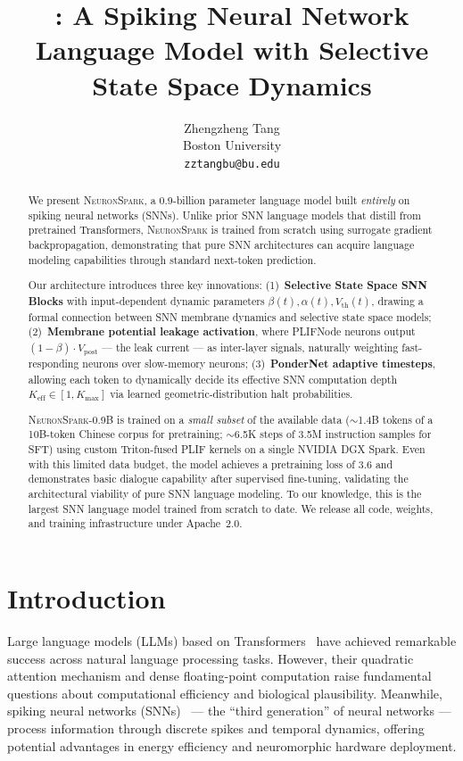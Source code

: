 \documentclass{article}
\title{\model{}: A Spiking Neural Network Language Model with Selective State Space Dynamics}
\author{
  Zhengzheng Tang \\
  Boston University \\
  \texttt{zztangbu@bu.edu}
}
\newcommand{\model}{\textsc{NeuronSpark}}
\newcommand{\vpost}{V_{\text{post}}}
\newcommand{\vth}{V_{\text{th}}}
\begin{document}
\maketitle

\begin{abstract}
We present \model{}, a 0.9-billion parameter language model built \emph{entirely} on spiking neural networks (SNNs).
Unlike prior SNN language models that distill from pretrained Transformers, \model{} is trained from scratch using surrogate gradient backpropagation, demonstrating that pure SNN architectures can acquire language modeling capabilities through standard next-token prediction.

Our architecture introduces three key innovations:
(1)~\textbf{Selective State Space SNN Blocks} with input-dependent dynamic parameters $\beta(t), \alpha(t), \vth(t)$, drawing a formal connection between SNN membrane dynamics and selective state space models;
(2)~\textbf{Membrane potential leakage activation}, where PLIFNode neurons output $(1-\beta)\cdot\vpost$ --- the leak current --- as inter-layer signals, naturally weighting fast-responding neurons over slow-memory neurons;
(3)~\textbf{PonderNet adaptive timesteps}, allowing each token to dynamically decide its effective SNN computation depth $K_{\text{eff}} \in [1, K_{\max}]$ via learned geometric-distribution halt probabilities.

\model{}-0.9B is trained on a \emph{small subset} of the available data ($\sim$1.4B tokens of a 10B-token Chinese corpus for pretraining; $\sim$6.5K steps of 3.5M instruction samples for SFT) using custom Triton-fused PLIF kernels on a single NVIDIA DGX Spark.
Even with this limited data budget, the model achieves a pretraining loss of 3.6 and demonstrates basic dialogue capability after supervised fine-tuning, validating the architectural viability of pure SNN language modeling.
To our knowledge, this is the largest SNN language model trained from scratch to date.
We release all code, weights, and training infrastructure under Apache~2.0.
\end{abstract}

\section{Introduction}
\label{sec:intro}

Large language models (LLMs) based on Transformers~\citep{vaswani2017attention} have achieved remarkable success across natural language processing tasks.
However, their quadratic attention mechanism and dense floating-point computation raise fundamental questions about computational efficiency and biological plausibility.
Meanwhile, spiking neural networks (SNNs)~\citep{maass1997networks} --- the ``third generation'' of neural networks --- process information through discrete spikes and temporal dynamics, offering potential advantages in energy efficiency and neuromorphic hardware deployment.
\end{document}
